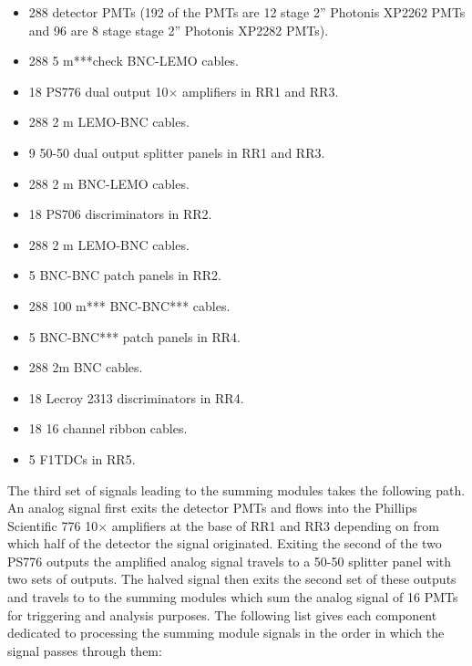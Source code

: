 \documentclass[oneside]{book}   %
\begin{document}
\begin{itemize}\itemsep6pt \parskip0pt 
	\item 288 detector PMTs (192 of the PMTs are 12 stage 2'' Photonis XP2262 PMTs and 96 are 8 stage stage 2'' Photonis XP2282 PMTs).
	\item 288 5 m***check BNC-LEMO cables. 
	\item 18 PS776 dual output 10$\times$ amplifiers in RR1 and RR3.
	\item 288 2 m LEMO-BNC cables. 
	\item 9 50-50 dual output splitter panels in RR1 and RR3. 
	\item 288 2 m BNC-LEMO cables.
	\item 18 PS706 discriminators in RR2.
	\item 288 2 m LEMO-BNC cables.
	\item 5 BNC-BNC patch panels in RR2.
	\item 288 100 m*** BNC-BNC*** cables. 
	\item 5 BNC-BNC*** patch panels in RR4. 
	\item 288 2m BNC cables.
	\item 18 Lecroy 2313 discriminators in RR4.
	\item 18 16 channel ribbon cables.
	\item 5 F1TDCs in RR5. 
\end{itemize}

The third set of signals leading to the summing modules takes the following path. An analog signal first exits the detector PMTs and flows into the Phillips Scientific 776 10$\times$ amplifiers at the base of RR1 and RR3 depending on from which half of the detector the signal originated. Exiting the second of the two PS776 outputs the amplified analog signal travels to a 50-50 splitter panel with two sets of outputs. The halved signal then exits the second set of these outputs and travels to to the summing modules which sum the analog signal of 16 PMTs for triggering and analysis purposes. The following list gives each component dedicated to processing the summing module signals in the order in which the signal passes through them:\\
\end{document}
